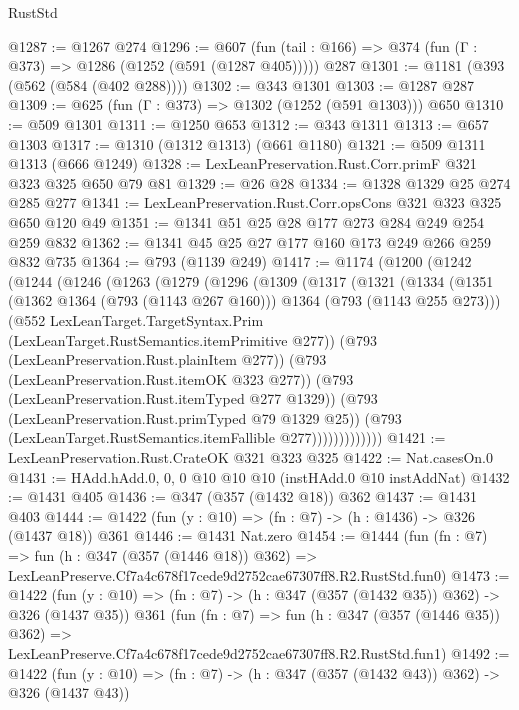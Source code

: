 \begin{lexlean}{RustStd}
\begin{coremodule}
@1287 := @1267 @274
@1296 := @607 (fun (tail : @166) => @374 (fun (Γ : @373) => @1286 (@1252 (@591 (@1287 @405))))) @287
@1301 := @1181 (@393 (@562 (@584 (@402 @288))))
@1302 := @343 @1301
@1303 := @1287 @287
@1309 := @625 (fun (Γ : @373) => @1302 (@1252 (@591 @1303))) @650
@1310 := @509 @1301
@1311 := @1250 @653
@1312 := @343 @1311
@1313 := @657 @1303
@1317 := @1310 (@1312 @1313) (@661 @1180)
@1321 := @509 @1311 @1313 (@666 @1249)
@1328 := LexLeanPreservation.Rust.Corr.primF @321 @323 @325 @650 @79 @81
@1329 := @26 @28
@1334 := @1328 @1329 @25 @274 @285 @277
@1341 := LexLeanPreservation.Rust.Corr.opsCons @321 @323 @325 @650 @120 @49
@1351 := @1341 @51 @25 @28 @177 @273 @284 @249 @254 @259 @832
@1362 := @1341 @45 @25 @27 @177 @160 @173 @249 @266 @259 @832 @735
@1364 := @793 (@1139 @249)
@1417 := @1174
    (@1200
      (@1242
        (@1244
          (@1246
            (@1263
              (@1279
                (@1296
                  (@1309
                    (@1317
                      (@1321
                        (@1334
                          (@1351
                            (@1362 @1364 (@793 (@1143 @267 @160)))
                            @1364
                            (@793 (@1143 @255 @273)))
                          (@552
                            LexLeanTarget.TargetSyntax.Prim
                            (LexLeanTarget.RustSemantics.itemPrimitive @277))
                          (@793 (LexLeanPreservation.Rust.plainItem @277))
                          (@793 (LexLeanPreservation.Rust.itemOK @323 @277))
                          (@793 (LexLeanPreservation.Rust.itemTyped @277 @1329))
                          (@793 (LexLeanPreservation.Rust.primTyped @79 @1329 @25))
                          (@793 (LexLeanTarget.RustSemantics.itemFallible @277)))))))))))))
@1421 := LexLeanPreservation.Rust.CrateOK @321 @323 @325
@1422 := Nat.casesOn.{0}
@1431 := HAdd.hAdd.{0, 0, 0} @10 @10 @10 (instHAdd.{0} @10 instAddNat)
@1432 := @1431 @405
@1436 := @347 (@357 (@1432 @18)) @362
@1437 := @1431 @403
@1444 := @1422 (fun (y : @10) => (fn : @7) -> (h : @1436) -> @326 (@1437 @18)) @361
@1446 := @1431 Nat.zero
@1454 := @1444
    (fun (fn : @7) =>
    fun (h : @347 (@357 (@1446 @18)) @362) =>
    LexLeanPreserve.Cf7a4c678f17cede9d2752cae67307ff8.R2.RustStd.fun0)
@1473 := @1422
    (fun (y : @10) => (fn : @7) -> (h : @347 (@357 (@1432 @35)) @362) -> @326 (@1437 @35))
    @361
    (fun (fn : @7) =>
    fun (h : @347 (@357 (@1446 @35)) @362) =>
    LexLeanPreserve.Cf7a4c678f17cede9d2752cae67307ff8.R2.RustStd.fun1)
@1492 := @1422
    (fun (y : @10) => (fn : @7) -> (h : @347 (@357 (@1432 @43)) @362) -> @326 (@1437 @43))

\end{coremodule}
\end{lexlean}
